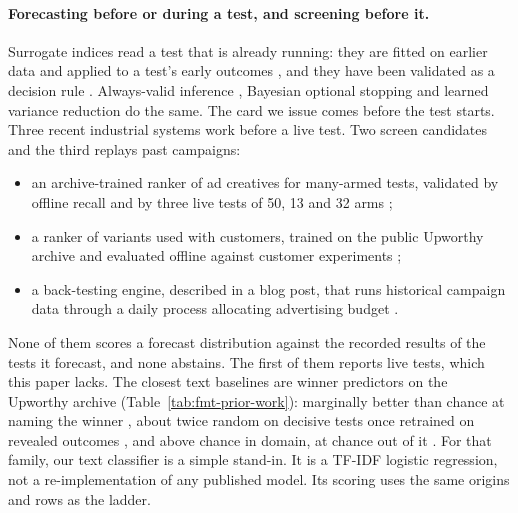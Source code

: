 \paragraph{Forecasting before or during a test, and screening before it.}
Surrogate indices read a test that is already running: they are fitted on earlier data and applied to a test's early outcomes \cite{athey2019surrogate}, and they have been validated as a decision rule \cite{zhang2023evaluating}. Always-valid inference \cite{johari2015always,johari2022always,howard2021timeuniform}, Bayesian optional stopping \cite{deng2016continuous} and learned variance reduction \cite{guo2021machine} do the same. The card we issue comes before the test starts. Three recent industrial systems work before a live test. Two screen candidates and the third replays past campaigns:
\begin{itemize}
\item an archive-trained ranker of ad creatives for many-armed tests, validated by offline recall and by three live tests of 50, 13 and 32 arms \cite{lee2026offline};
\item a ranker of variants used with customers, trained on the public Upworthy archive and evaluated offline against customer experiments \cite{hu2026experimentation};
\item a back-testing engine, described in a blog post, that runs historical campaign data through a daily process allocating advertising budget \cite{mazzanti2026backtesting}.
\end{itemize}
None of them scores a forecast distribution against the recorded results of the tests it forecast, and none abstains. The first of them reports live tests, which this paper lacks. The closest text baselines are winner predictors on the Upworthy archive (Table~\ref{tab:fmt-prior-work}): marginally better than chance at naming the winner \cite{ye2025lola}, about twice random on decisive tests once retrained on revealed outcomes \cite{clark2026predict}, and above chance in domain, at chance out of it \cite{khimani2026finetuning}.
For that family, our text classifier is a simple stand-in. It is a TF-IDF logistic regression, not a re-implementation of any published model. Its scoring uses the same origins and rows as the ladder.
